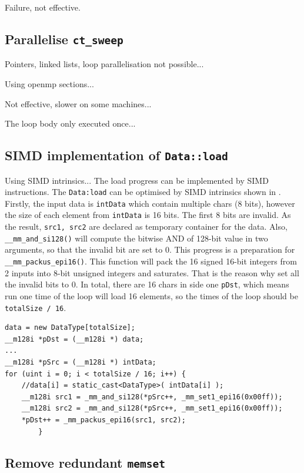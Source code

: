 \documentclass[conference]{IEEEtran}
\begin{document}
Failure, not effective.

\subsection{Parallelise \texttt{ct\_sweep}}

Pointers, linked lists, loop parallelisation not possible...

Using openmp sections...

Not effective, slower on some machines...

The loop body only executed once...

\subsection{SIMD implementation of \texttt{Data::load}}

Using SIMD intrinsics...
The load progress can be implemented by SIMD instructions. The \texttt{Data:load} can be optimised by SIMD intrinsics shown in \cite{advnotes}. Firstly, the input data is \texttt{intData} which contain multiple chars (8 bits), however the size of each element from \texttt{intData} is 16 bits. The first 8 bits are invalid. As the result, \texttt{src1, src2} are declared as temporary container for the data. Also, \texttt{\_\_mm\_and\_si128()} will compute the bitwise AND of 128-bit value in two arguments, so that the invalid bit are set to 0. This progress is a preparation for \texttt{\_\_mm\_packus\_epi16()}. This function will pack the 16 signed 16-bit integers from 2 inputs into 8-bit unsigned integers and saturates. That is the reason why set all the invalid bits to 0. In total, there are 16 chars in side one \texttt{pDst}, which means run one time of the loop will load 16 elements, so the times of the loop should be \texttt{totalSize / 16}.

\begin{lstlisting}[caption={Data Load with SIMD Intrinsics},captionpos=b,label=lst:mem]
data = new DataType[totalSize];
__m128i *pDst = (__m128i *) data;
...
__m128i *pSrc = (__m128i *) intData;
for (uint i = 0; i < totalSize / 16; i++) {
	//data[i] = static_cast<DataType>( intData[i] );
	__m128i src1 = _mm_and_si128(*pSrc++, _mm_set1_epi16(0x00ff));
	__m128i src2 = _mm_and_si128(*pSrc++, _mm_set1_epi16(0x00ff));
	*pDst++ = _mm_packus_epi16(src1, src2);
		}
\end{lstlisting}

\subsection{Remove redundant \texttt{memset}}
\end{document}
